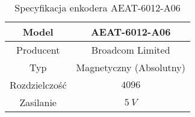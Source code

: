 \begin{table}
	[b]	\caption{Specyfikacja enkodera AEAT-6012-A06}
	\label{tab:encoder_spec}
	\centering
	\begin{tabular}{|c|c|}
		\hline
		Model & AEAT-6012-A06 \\
		\hline
		Producent & Broadcom Limited \\
		\hline
		Typ & Magnetyczny (Absolutny) \\
		\hline
		Rozdzielczość &  $\num{4096}$ \\
		\hline
		Zasilanie & $\SI{5}{V}$ \\
		\hline
	\end{tabular}
\end{table}


